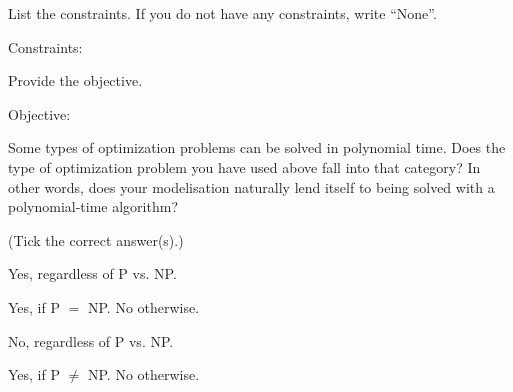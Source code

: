 \documentclass{article}
\begin{document}
\begin{Question}
\begin{Subquestion}
List the constraints. If you do not have any constraints, write ``None''.

\begin{makespace}
\vspace{20mm}
\end{makespace}
Constraints:
\begin{makespace}
\vspace{30mm}
\end{makespace}
\end{Subquestion}

\begin{makespace}
\newpage
\end{makespace}
\begin{Subquestion}
Provide the objective.

\begin{makespace}
\vspace{10mm}
\end{makespace}
Objective:
\begin{makespace}
\vspace{20mm}
\end{makespace}
\end{Subquestion}

\begin{Subquestion}
Some types of optimization problems can be solved in polynomial time. Does the type of optimization problem you have used above fall into that category? In other words, does your modelisation naturally lend itself to being solved with a polynomial-time algorithm?

(Tick the correct answer(s).)
\begin{itemmultiplechoice}
\item Yes, regardless of P vs. NP.
\item Yes, if P $=$ NP. No otherwise.
\item No, regardless of P vs. NP.
\item Yes, if P $\neq$ NP. No otherwise.
\end{itemmultiplechoice}
\end{Subquestion}
\end{Question}
\end{document}
